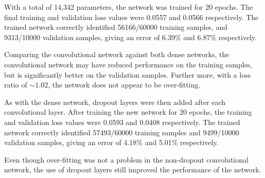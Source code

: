 With a total of 14,342 parameters, the network was trained for 20 epochs.
The final training and validation loss values were 0.0557 and 0.0566
respectively.
The trained network correctly identified 56166/60000 training samples, and
9313/10000 validation samples, giving an error of 6.39\% and 6.87\%
respectively.

Comparing the convolutional network against both dense networks, the
convolutional network may have reduced performance on the training samples, but
is significantly better on the validation samples.
Further more, with a loss ratio of $\sim1.02$, the network does not appear to be
over-fitting.

As with the dense network, dropout layers were then added after each
convolutional layer.
After training the new network for 20 epochs, the training and validation loss
values were 0.0593 and 0.0408 respectively.
The trained network correctly identified 57493/60000 training samples and
9499/10000 validation samples, giving an error of 4.18\% and 5.01\%
respectively.

Even though over-fitting was not a problem in the non-dropout convolutional
network, the use of dropout layers still improved the performance of the
network.





%



